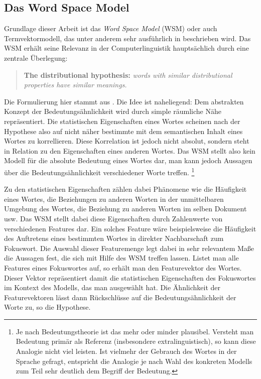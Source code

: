 \documentclass[11pt,numbers=noenddot]{scrartcl}
\begin{document}
\subsection{Das Word Space Model}
Grundlage dieser Arbeit ist das \emph{Word Space Model} (WSM) oder auch Termvektormodell, das unter anderem sehr ausführlich in \citet{sahlgren2006word} beschrieben wird. Das WSM erhält seine Relevanz in der Computerlinguistik hauptsächlich durch eine zentrale Überlegung:
\begin{quote}
    \textbf{The distributional hypothesis:} \emph{words with similar distributional properties have similar meanings.}
\end{quote}
Die Formulierung hier stammt aus \citet[S. 21]{sahlgren2006word}. Die Idee ist naheliegend: Dem abstrakten Konzept der Bedeutungsähnlichkeit wird durch simple räumliche Nähe repräsentiert. Die statistischen Eigenschaften eines Wortes scheinen nach der Hypothese also auf nicht näher bestimmte mit dem semantischen Inhalt eines Wortes zu korrellieren. Diese Korrelation ist jedoch nicht absolut, sondern steht in Relation zu den Eigenschaften eines anderen Wortes. Das WSM stellt also kein Modell für die absolute Bedeutung eines Wortes dar, man kann jedoch Aussagen über die Bedeutungsähnlichkeit verschiedener Worte treffen. \footnote{Je nach Bedeutungstheorie ist das mehr oder minder plausibel. Versteht man Bedeutung primär als Referenz (insbesondere extralinguistisch), so kann diese Analogie nicht viel leisten. Ist vielmehr der Gebrauch des Wortes in der Sprache gefragt, entspricht die Analogie je nach Wahl des konkreten Modells zum Teil sehr deutlich dem Begriff der Bedeutung.}

Zu den statistischen Eigenschaften zählen dabei Phänomene wie die Häufigkeit eines Wortes, die Beziehungen zu anderen Worten in der unmittelbaren Umgebung des Wortes, die Beziehung zu anderen Worten im selben Dokument usw. Das WSM stellt dabei diese Eigenschaften durch Zahlenwerte von verschiedenen Features dar. Ein solches Feature wäre beispielsweise die Häufigkeit des Auftretens eines bestimmten Wortes in direkter Nachbarschaft zum Fokuswort. Die Auswahl dieser Featuremenge legt dabei in sehr relevantem Maße die Aussagen fest, die sich mit Hilfe des WSM treffen lassen. Listet man alle Features eines Fokuswortes auf, so erhält man den Featurevektor des Wortes. Dieser Vektor repräsentiert damit die statistischen Eigenschaften des Fokuswortes im Kontext des Modells, das man ausgewählt hat. Die Ähnlichkeit der Featurevektoren lässt dann Rückschlüsse auf die Bedeutungsähnlichkeit der Worte zu, so die Hypothese.
\end{document}
